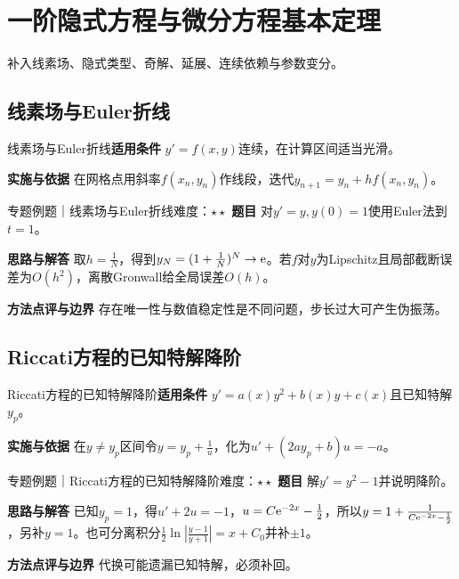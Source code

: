 \section{一阶隐式方程与微分方程基本定理}\label{mat:ode_theory}
\begin{examtip}补入线素场、隐式类型、奇解、延展、连续依赖与参数变分。\end{examtip}
\subsection{线素场与Euler折线}\label{mat:ode_theory:direction}
\begin{method}{线素场与Euler折线}\textbf{适用条件} $y\prime=f(x,y)$连续，在计算区间适当光滑。\par\textbf{实施与依据} 在网格点用斜率$f(x_n,y_n)$作线段，迭代$y_{n+1}=y_n+h f(x_n,y_n)$。\end{method}
\begin{example}{专题例题｜线素场与Euler折线}{难度：$\star\star$}
\textbf{题目} 对$y\prime=y,y(0)=1$使用Euler法到$t=1$。\par\textbf{思路与解答} 取$h=\frac{1}{N}$，得到$y_N=(1+\frac{1}{N})^N\to\mathrm{e}$。若$f$对$y$为Lipschitz且局部截断误差为$O(h^2)$，离散Gronwall给全局误差$O(h)$。\par\textbf{方法点评与边界} 存在唯一性与数值稳定性是不同问题，步长过大可产生伪振荡。
\end{example}
\subsection{Riccati方程的已知特解降阶}\label{mat:ode_theory:riccati}
\begin{method}{Riccati方程的已知特解降阶}\textbf{适用条件} $y\prime=a(x)y^2+b(x)y+c(x)$且已知特解$y_p$。\par\textbf{实施与依据} 在$y\ne y_p$区间令$y=y_p+\frac{1}{u}$，化为$u\prime+(2ay_p+b)u=-a$。\end{method}
\begin{example}{专题例题｜Riccati方程的已知特解降阶}{难度：$\star\star$}
\textbf{题目} 解$y\prime=y^2-1$并说明降阶。\par\textbf{思路与解答} 已知$y_p=1$，得$u\prime+2u=-1$，$u=C\mathrm{e}^{-2x}-\frac{1}{2}$，所以$y=1+\frac{1}{C\mathrm{e}^{-2x}-\frac{1}{2}}$，另补$y=1$。也可分离积分$\frac12\ln|\frac{y-1}{y+1}|=x+C_0$并补$\pm1$。\par\textbf{方法点评与边界} 代换可能遗漏已知特解，必须补回。
\end{example}
